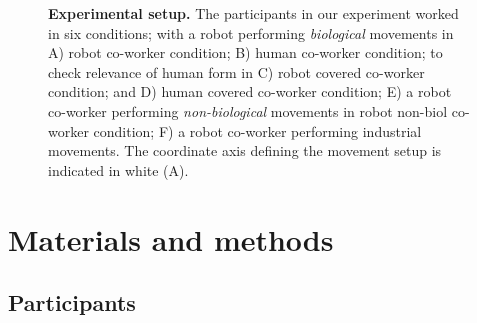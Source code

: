 \begin{figure}[b]
	\caption{{\bf Experimental setup.} The participants in our experiment worked in six conditions; with a robot performing \textit{biological} movements in A) robot co-worker condition; B) human co-worker condition; to check relevance of  human form in C) robot covered co-worker condition; and D) human covered co-worker condition; E) a robot co-worker performing \textit{non-biological} movements in robot non-biol co-worker condition; F) a robot co-worker performing industrial movements. The coordinate axis defining the movement setup is indicated in white (A).}
	\label{fig:setup1}
\end{figure}


\clearpage
\section{Materials and methods} \label{methods}

\subsection{Participants}

